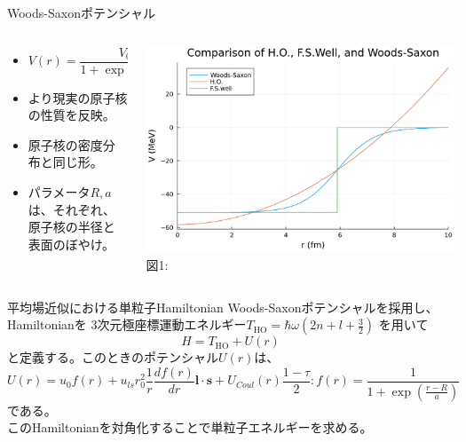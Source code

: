 \documentclass[aspectratio=169, 12pt, dvipdfmx]{beamer}
\begin{document}
\begin{frame}{Woods-Saxonポテンシャル}
  \begin{columns}[totalwidth=1.0\linewidth]
    \begin{column}[t]{0.45\linewidth}
      \begin{itemize}
        \item $V(r)=\dfrac{V_0(< 0)}{1+\exp((r-R)/a)}$
        \item より現実の原子核の性質を反映。
        \item 原子核の密度分布と同じ形。
        \item パラメータ$R,a$は、それぞれ、原子核の半径と表面のぼやけ。
      \end{itemize}
    \end{column}

    \begin{column}[T]{0.55\linewidth}
      \centering
      \includegraphics[width=\textwidth]{fig_pdf/Comp_pt.pdf}
      \vspace{5pt} %
      \scriptsize 図1:
  \end{column}
  \end{columns}
\end{frame}

\begin{frame}{平均場近似における単粒子Hamiltonian}
  Woods-Saxonポテンシャルを採用し、Hamiltonianを
  3次元極座標運動エネルギー$T_{\text{HO}}=\hbar\omega\left(2n+l+\frac{3}{2}\right)$
  を用いて
  \begin{equation}
    H=T_{\text{HO}}+U(r)
  \end{equation}
  と定義する。このときのポテンシャル$U(r)$は、
  \begin{equation}
    U(r)=u_0f(r)+u_{ls}r_0^2\dfrac{1}{r}\dfrac{df(r)}{dr}\boldsymbol{l}\cdot\boldsymbol{s}+U_{Coul}(r)\dfrac{1-\tau}{2}:f(r)=\dfrac{1}{1+\exp\left(\frac{r-R}{a}\right)}
  \end{equation}
  である。\\
  このHamiltonianを対角化することで単粒子エネルギーを求める。
\end{frame}
\end{document}

